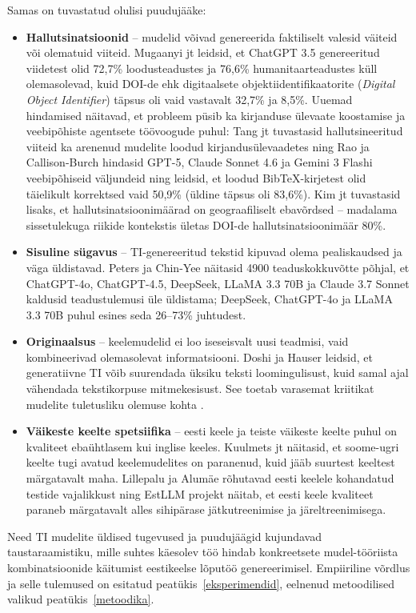 Samas on tuvastatud olulisi puudujääke:
\begin{itemize}
    \item \textbf{Hallutsinatsioonid} -- mudelid võivad genereerida faktiliselt valesid väiteid või olematuid viiteid. Mugaanyi jt \cite{mugaanyi2024citation} leidsid, et ChatGPT 3.5 genereeritud viidetest olid 72,7\% loodusteadustes ja 76,6\% humanitaarteadustes küll olemasolevad, kuid DOI-de ehk digitaalsete objektiidentifikaatorite (\textit{Digital Object Identifier}) täpsus oli vaid vastavalt 32,7\% ja 8,5\%. Uuemad hindamised näitavad, et probleem püsib ka kirjanduse ülevaate koostamise ja veebipõhiste agentsete töövoogude puhul: Tang jt \cite{tang2025large} tuvastasid hallutsineeritud viiteid ka arenenud mudelite loodud kirjandusülevaadetes ning Rao ja Callison-Burch \cite{rao2026bibtex} hindasid GPT-5, Claude Sonnet 4.6 ja Gemini 3 Flashi veebipõhiseid väljundeid ning leidsid, et loodud BibTeX-kirjetest olid täielikult korrektsed vaid 50,9\% (üldine täpsus oli 83,6\%). Kim jt \cite{kim2025geographic} tuvastasid lisaks, et hallutsinatsioonimäärad on geograafiliselt ebavõrdsed -- madalama sissetulekuga riikide kontekstis ületas DOI-de hallutsinatsioonimäär 80\%.
    \item \textbf{Sisuline sügavus} -- TI-genereeritud tekstid kipuvad olema pealiskaudsed ja väga üldistavad. Peters ja Chin-Yee \cite{peters2025generalization} näitasid 4900 teaduskokkuvõtte põhjal, et ChatGPT-4o, ChatGPT-4.5, DeepSeek, LLaMA 3.3 70B ja Claude 3.7 Sonnet kaldusid teadustulemusi üle üldistama; DeepSeek, ChatGPT-4o ja LLaMA 3.3 70B puhul esines seda 26--73\% juhtudest.
    \item \textbf{Originaalsus} -- keelemudelid ei loo iseseisvalt uusi teadmisi, vaid kombineerivad olemasolevat informatsiooni. Doshi ja Hauser \cite{doshi2024generative} leidsid, et generatiivne TI võib suurendada üksiku teksti loomingulisust, kuid samal ajal vähendada tekstikorpuse mitmekesisust. See toetab varasemat kriitikat mudelite tuletusliku olemuse kohta \cite{bender2021dangers}.
    \item \textbf{Väikeste keelte spetsiifika} -- eesti keele ja teiste väikeste keelte puhul on kvaliteet ebaühtlasem kui inglise keeles. Kuulmets jt \cite{kuulmets2025finno} näitasid, et soome-ugri keelte tugi avatud keelemudelites on paranenud, kuid jääb suurtest keeltest märgatavalt maha. Lillepalu ja Alumäe \cite{lillepalu2025estonianbenchmark} rõhutavad eesti keelele kohandatud testide vajalikkust ning EstLLM projekt \cite{dorkin2026estllm} näitab, et eesti keele kvaliteet paraneb märgatavalt alles sihipärase jätkutreenimise ja järeltreenimisega.
\end{itemize}

Need TI mudelite üldised tugevused ja puudujäägid kujundavad taustaraamistiku, mille suhtes käesolev töö hindab konkreetsete mudel-tööriista kombinatsioonide käitumist eestikeelse lõputöö genereerimisel. Empiiriline võrdlus ja selle tulemused on esitatud peatükis~\ref{eksperimendid}, eelnenud metoodilised valikud peatükis~\ref{metoodika}.
